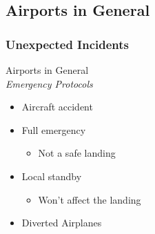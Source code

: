 \subsection{Airports in General}

\subsubsection{Unexpected Incidents}
\begin{frame}{Airports in General\\\small\textit{Emergency Protocols}}{}
	\begin{itemize}
		\item Aircraft accident
		\item Full emergency
			\begin{itemize}
				\item Not a safe landing
			\end{itemize}
		\item Local standby
			\begin{itemize}
				\item Won't affect the landing
			\end{itemize}
		\item Diverted Airplanes
	\end{itemize}
\end{frame}